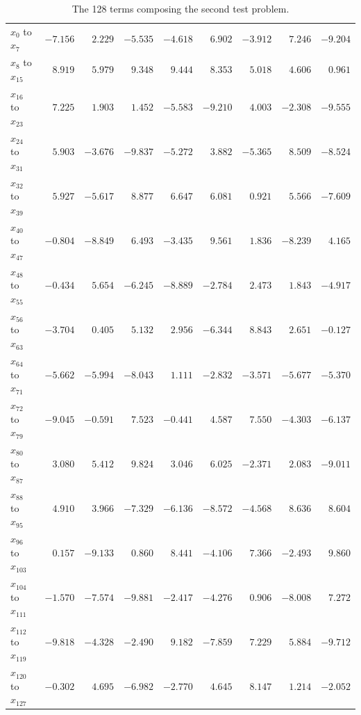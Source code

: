 \documentclass[runningheads,a4paper]{llncs}
\begin{document}
\begin{table}
\caption{The 128 terms composing the second test problem.}
\begin{center}
\begin{tabular}{lrrrrrrrr}
\hline
\hline\rule{0pt}{12pt}
$x_{0}$ to $x_{7}$ & $-7.156$ & $2.229$ & $-5.535$ & $-4.618$ & $6.902$ & $-3.912$ & $7.246$ & $-9.204$ \\ 
$x_{8}$ to $x_{15}$ & $8.919$ & $5.979$ & $9.348$ & $9.444$ & $8.353$ & $5.018$ & $4.606$ & $0.961$ \\ 
$x_{16}$ to $x_{23}$ & $7.225$ & $1.903$ & $1.452$ & $-5.583$ & $-9.210$ & $4.003$ & $-2.308$ & $-9.555$ \\ 
$x_{24}$ to $x_{31}$ & $5.903$ & $-3.676$ & $-9.837$ & $-5.272$ & $3.882$ & $-5.365$ & $8.509$ & $-8.524$\\ 
$x_{32}$ to $x_{39}$ & $5.927$ & $-5.617$ & $8.877$ & $6.647$ & $6.081$ & $0.921$ & $5.566$ & $-7.609$ \\ 
$x_{40}$ to $x_{47}$ & $-0.804$ & $-8.849$ & $6.493$ & $-3.435$ & $9.561$ & $1.836$ & $-8.239$ & $4.165$\\ 
$x_{48}$ to $x_{55}$ & $-0.434$ & $5.654$ & $-6.245$ & $-8.889$ & $-2.784$ & $2.473$ & $1.843$ & $-4.917$\\ 
$x_{56}$ to $x_{63}$ & $-3.704$ & $0.405$ & $5.132$ & $2.956$ & $-6.344$ & $8.843$ & $2.651$ & $-0.127$ \\ 
$x_{64}$ to $x_{71}$ & $-5.662$ & $-5.994$ & $-8.043$ & $1.111$ & $-2.832$ & $-3.571$ & $-5.677$ & $-5.370$ \\ 
$x_{72}$ to $x_{79}$ & $-9.045$ & $-0.591$ & $7.523$ & $-0.441$ & $4.587$ & $7.550$ & $-4.303$ & $-6.137$ \\ 
$x_{80}$ to $x_{87}$ & $3.080$ & $5.412$ & $9.824$ & $3.046$ & $6.025$ & $-2.371$ & $2.083$ & $-9.011$ \\ 
$x_{88}$ to $x_{95}$ & $4.910$ & $3.966$ & $-7.329$ & $-6.136$ & $-8.572$ & $-4.568$ & $8.636$ & $8.604$ \\ 
$x_{96}$ to $x_{103}$ & $0.157$ & $-9.133$ & $0.860$ & $8.441$ & $-4.106$ & $7.366$ & $-2.493$ & $9.860$ \\ 
$x_{104}$ to $x_{111}$ & $-1.570$ & $-7.574$ & $-9.881$ & $-2.417$ & $-4.276$ & $0.906$ & $-8.008$ & $7.272$ \\ 
$x_{112}$ to $x_{119}$ & $-9.818$ & $-4.328$ & $-2.490$ & $9.182$ & $-7.859$ & $7.229$ & $5.884$ & $-9.712$ \\ 
$x_{120}$ to $x_{127}$ & $-0.302$ & $4.695$ & $-6.982$ & $-2.770$ & $4.645$ & $8.147$ & $1.214$ & $-2.052$\\
\hline

\end{tabular}
\label{tb:128-terms}
\end{center}
\end{table}
\end{document}
